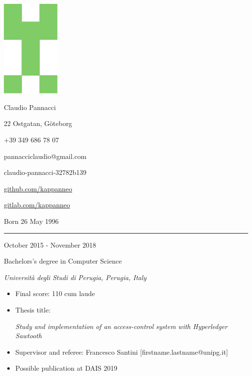 \documentclass[a4paper,10pt]{article}
\newlength{\cvcolumngapwidth}
\newlength{\cvleftcolumnwidth}
\newlength{\cvrightcolumnwidth}
\newcommand{\cvnamestyle}[1]{{\Large\cvnamefont\textcolor{cvnamecolor}{#1}}}
\newcommand{\cvsectionstyle}[1]{{\normalsize\cvsectionfont\textcolor{cvsectioncolor}{#1}}}
\newcommand{\cvtitlestyle}[1]{{\large\cvtitlefont\textcolor{cvtitlecolor}{#1}}}
\newcommand{\cvdurationstyle}[1]{{\small\cvdurationfont\textcolor{cvdurationcolor}{#1}}}
\newlength{\cvafteritemskipamount}
\newlength{\cvaftersectionskipamount}
\newlength{\cvafternameskipamount}
\newlength{\cvafterpersonalinfolineskipamount}
\newlength{\cvaftertitleskipamount}
\newlength{\cvparskip}
\newcommand{\cvpersonalinfo}[2]{
    \begin{minipage}[t]{\cvleftcolumnwidth}
        \vspace{0mm} %
        \raggedleft #1
    \end{minipage}%
    \hspace{\cvcolumngapwidth}%
    \begin{minipage}[t]{\cvrightcolumnwidth}
        \vspace{0mm} %
        #2
    \end{minipage}

    \vspace{\cvafteritemskipamount}
}
\newcommand{\cvname}[1]{
    \cvnamestyle{#1}

    \vspace{\cvafternameskipamount}
}
\newcommand{\cvpersonalinfolinewithicon}[3]{
    \raisebox{.5\fontcharht\font`E-.5\height}{\texttt{[image: \#2]}}
    #3

    \vspace{\cvafterpersonalinfolineskipamount}
}
\newcommand{\cvsection}[1]{
    \begin{minipage}[t]{\cvleftcolumnwidth}
        \raggedleft\cvsectionstyle{#1}
    \end{minipage}%
    \hspace{\cvcolumngapwidth}%
    \begin{minipage}[t]{\cvrightcolumnwidth}
        \textcolor{cvrulecolor}{\rule{\cvrightcolumnwidth}{0.3mm}}
    \end{minipage}

    \vspace{\cvaftersectionskipamount}
}
\newcommand{\cvitem}[2]{
    \begin{minipage}[t]{\cvleftcolumnwidth}
        \raggedleft #1
    \end{minipage}%
    \hspace{\cvcolumngapwidth}%
    \begin{minipage}[t]{\cvrightcolumnwidth}
        \setlength{\parskip}{\cvparskip} #2
    \end{minipage}

    \vspace{\cvafteritemskipamount}
}
\newcommand{\cvtitle}[1]{
    \cvtitlestyle{#1}

    \vspace{\cvaftertitleskipamount}
    \vspace{-\cvparskip}
}
\begin{document}

\cvpersonalinfo{
    \includegraphics[height=49mm]{kappanneo.pdf}
}{
    \cvname{Claudio Pannacci}

    \cvpersonalinfolinewithicon{height=4mm}{072-location.pdf}{
        22 Ostgatan, Göteborg
    }

    \cvpersonalinfolinewithicon{height=4mm}{067-phone.pdf}{
        +39 349 686 78 07
    }

    \cvpersonalinfolinewithicon{height=4mm}{070-envelop.pdf}{
        pannacciclaudio@gmail.com
    }

    \cvpersonalinfolinewithicon{height=4mm}{458-linkedin.pdf}{
        claudio-pannacci-32782b139
    }

    \cvpersonalinfolinewithicon{height=4mm}{github.pdf}{
        \href{https://github.com/kappanneo}{github.com/kappanneo}
    }

    \cvpersonalinfolinewithicon{height=4mm}{gitlab.pdf}{
         \href{https://gitlab.com/kappanneo}{gitlab.com/kappanneo}
    }

    Born 26 May 1996
}



\cvsection{EDUCATION}


\cvitem{
    \cvdurationstyle{October 2015 - November 2018}
}{
    \cvtitle{Bachelors's degree in Computer Science}

    \textit{Università degli Studi di Perugia, Perugia, Italy}

    \begin{itemize}[leftmargin=*]
        \item Final score:
        110 cum laude

        \item Thesis title:
        
        \textit{Study and implementation of an access-control system with Hyperledger Sawtooth}
        
        \item Supervisor and referee:
        Francesco Santini [firstname.lastname@unipg.it]
        
        \item Possible publication at DAIS 2019
    \end{itemize}
}
\end{document}
